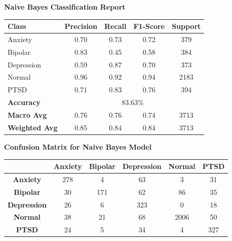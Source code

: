 \begin{center}
    \textbf{Naive Bayes Classification Report} \\[0.5em]
    \begin{tabular}{|l|c|c|c|c|}
        \hline
        \textbf{Class} & \textbf{Precision} & \textbf{Recall} & \textbf{F1-Score} & \textbf{Support} \\ \hline
        Anxiety        & 0.70               & 0.73            & 0.72              & 379              \\ \hline
        Bipolar        & 0.83               & 0.45            & 0.58              & 384              \\ \hline
        Depression     & 0.59               & 0.87            & 0.70              & 373              \\ \hline
        Normal         & 0.96               & 0.92            & 0.94              & 2183             \\ \hline
        PTSD           & 0.71               & 0.83            & 0.76              & 394              \\ \hline
        \textbf{Accuracy} & \multicolumn{4}{|c|}{83.63\%} \\ \hline
        \textbf{Macro Avg} & 0.76            & 0.76            & 0.74              & 3713             \\ \hline
        \textbf{Weighted Avg} & 0.85         & 0.84            & 0.84              & 3713             \\ \hline
    \end{tabular}
\end{center}

\vspace{0.25em}

\begin{center}
    \textbf{Confusion Matrix for Naive Bayes Model} \\[0.5em]
    \begin{tabular}{|c|c|c|c|c|c|}
        \hline
        & \textbf{Anxiety} & \textbf{Bipolar} & \textbf{Depression} & \textbf{Normal} & \textbf{PTSD} \\ \hline
        \textbf{Anxiety}    & 278 & 4    & 63  & 3    & 31    \\ \hline
        \textbf{Bipolar}    & 30  & 171  & 62  & 86   & 35    \\ \hline
        \textbf{Depression} & 26  & 6    & 323 & 0    & 18    \\ \hline
        \textbf{Normal}     & 38  & 21   & 68  & 2006 & 50    \\ \hline
        \textbf{PTSD}       & 24  & 5    & 34  & 4    & 327   \\ \hline
    \end{tabular}
\end{center}

